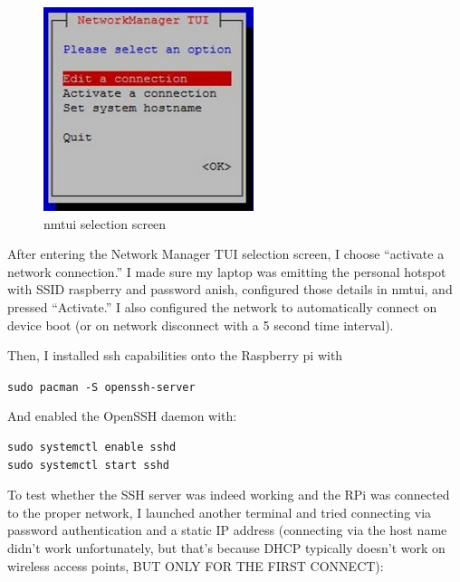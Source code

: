 \begin{figure}
    \includegraphics[width=\linewidth]{media/image22.png}
\caption{nmtui selection screen}
\end{figure} After entering the Network Manager TUI selection screen, I choose “activate a network connection.” I made sure my laptop was emitting the personal hotspot with SSID raspberry and password anish, configured those details in nmtui, and pressed “Activate.” I also configured the network to automatically connect on device boot (or on network disconnect with a 5 second time interval).

Then, I installed ssh capabilities onto the Raspberry pi with

\Verb"sudo pacman -S openssh-server"

\newpage

And enabled the OpenSSH daemon with:

\begin{verbatim}
sudo systemctl enable sshd
sudo systemctl start sshd
\end{verbatim}

To test whether the SSH server was indeed working and the RPi was connected to the proper network, I launched another terminal and tried connecting via password authentication and a static IP address (connecting via the host name didn't work unfortunately, but that's because DHCP typically doesn't work on wireless access points, BUT ONLY FOR THE FIRST CONNECT):

